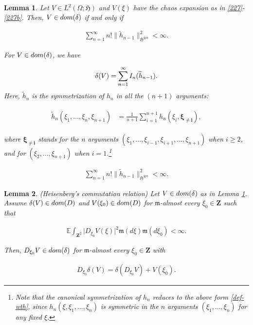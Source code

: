 \documentclass[10pt,a4paper]{amsart}
\newtheorem{lemma}{Lemma}
\newcommand{\E}{\mathbb{E}}
\renewcommand{\O}{\Omega}
\newcommand{\dl}{\delta}
\newcommand{\dom}{\textup{dom}}
\newcommand{\fH}{\mathfrak{H}}
\newcommand{\fm}{\mathfrak{m}}
\newcommand{\noi}{\noindent}
\newcommand{\wt}{\widetilde}
\begin{document}
\begin{lemma} \label{lem_dl}
Let  $V\in L^2(\O;\fH)$ and $V(\xi)$ have the chaos expansion as in  \eqref{227}-\eqref{227b}.
Then, $V\in\dom(\dl)$
if and only if 

 \noi
\begin{align}  \label{227d}
\sum_{n=1}^\infty n! \| \wt{h}_{n-1} \|_{\fH^{\otimes n}}^2 < \infty.
\end{align}

\noi
For $V\in\dom(\dl)$, we have
 
 
 \noi
\begin{align}   \notag%
  \dl(V) = \sum_{n=1}^\infty I_n( \wt{h}_{n-1} ).
\end{align}
Here, $\wt{h}_n$ is the symmetrization of $h_n$ in all the $(n+1)$ arguments:

\noi
\begin{align}  \label{def-wth}
\begin{aligned}
\wt{h}_n(\xi_1,\ldots,\xi_n,\xi_{n+1})
&=
\frac{1}{n+1}\sum_{i=1}^{n+1}h_n(\xi_i, \pmb{\xi_{\neq i} } ),
\end{aligned}
\end{align}

\noi
where $\pmb{\xi_{\neq i} } $ stands for the $n$ arguments $(\xi_1, ... , \xi_{i-1}, \xi_{i+1}, ... ,\xi_{n+1})$
when $i\geq 2$,  and for $(\xi_2, ... ,\xi_{n+1})$ when $i=1$.\footnote{Note that the canonical 
symmetrization of $h_n$ reduces to the above form \eqref{def-wth}, since
$h_n(\xi, \xi_1, ... , \xi_n)$ is symmetric in the $n$ arguments $(\xi_1, ... , \xi_n)$
for any fixed $\xi$.}


\end{lemma}

\begin{align}  
\sum_{n=1}^\infty n! \| \wt{h}_{n-1} \|_{\fH^{\otimes n}}^2 < \infty.
\end{align}

\begin{lemma}\label{lem_Heis}\textup{(Heisenberg's commutation relation)} 
%
%
%
Let $V\in\dom(\dl)$ as in Lemma \ref{lem_dl}.
Assume $\dl(V)\in\dom(D)$ and $V(\xi_0)\in\dom(D)$
for $\fm$-almost every $\xi_0\in\mathbf{Z}$ such that 

\noi
\begin{align}\label{cond_H1}
\E\int_{\mathbf{Z}^2} \big| D_{\xi_0} V(\xi) \big|^2 \fm(d\xi) \fm(d\xi_0) <\infty.
\end{align}

\noi
 Then,     $D_{\xi_0}V  \in \dom(\dl)$ for $\fm$-almost 
every $\xi_0\in\mathbf{Z}$ with



 

\noi
\begin{align}\label{com_rel}
D_{\xi_0}  \dl(V)=  \dl(  D_{\xi_0} V) + V(\xi_0) .
\end{align}

\end{lemma}
\end{document}
